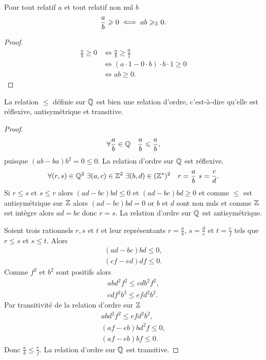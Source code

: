 \begin{prop}
  Pour tout relatif $a$ et tout relatif non nul $b$
  \begin{equation}
    \frac{a}{b} \geqslant 0 \iff ab \geqslant_{\mathbb{Z}} 0.
  \end{equation}
\end{prop}
\begin{proof}
  \begin{align}
    \frac{a}{b} \geqslant 0 &\iff \frac{a}{b} \geqslant \frac{0}{1} \\
    & \iff (a \cdot 1 - 0 \cdot b)\cdot b \cdot 1 \geqslant 0 \\
    & \iff ab \geqslant 0.
  \end{align}
\end{proof}
\begin{prop}
  La relation $\leqslant$ définie sur $\mathbb{Q}$ est bien une relation d'ordre, c'est-à-dire qu'elle est réflexive, antisymétrique et transitive.
\end{prop}
\begin{proof}
  \begin{equation}
    \forall \frac{a}{b} \in \mathbb{Q} \quad \frac{a}{b} \leqslant \frac{a}{b},
  \end{equation}
  puisque $(ab-ba)b^2=0 \leqslant 0$. La relation d'ordre sur $\mathbb{Q}$ est réflexive.
  \begin{equation}
    \forall (r,s) \in \Q^2 \ \exists (a,c) \in \Z^2 \ \exists (b,d) \in (\Z^*)^2 \quad r=\frac{a}{b} \ s=\frac{c}{d}.
  \end{equation}
  Si $r\leqslant s$ et $s \leqslant r$ alors $(ad-bc)bd \leqslant 0$ et $(ad-bc)bd \geqslant 0$ et comme $\leqslant$ est antisymétrique sur $\mathbb{Z}$ alors $(ad-bc)bd=0$ or $b$ et $d$ sont non nuls et comme $\mathbb{Z}$ est intègre alors $ad=bc$ donc $r=s$. La relation d'ordre sur $\mathbb{Q}$ est antisymétrique.

Soient trois rationnels $r,s$ et $t$ et leur représentants $r=\frac{a}{b}$, $s=\frac{d}{c}$ et $t=\frac{e}{f}$ tels que $r \leqslant s$ et $s \leqslant t$. Alors
\begin{align}
  (ad-bc)bd \leqslant 0, \\
  (cf-ed)df \leqslant 0.
\end{align}
Comme $f^2$ et $b^2$ sont positifs alors
\begin{align}
  abd^2f^2 \leqslant cdb^2f^2, \\
  cdf^2b^2 \leqslant efd^2b^2.
\end{align}
Par transitivité de la relation d'ordre sur $\mathbb{Z}$
\begin{align}
  abd^2f^2 \leqslant efd^2b^2, \\
  (af-eb)bd^2f \leqslant 0, \\
  (af-eb)bf \leqslant 0.
\end{align}
Donc $\frac{a}{b} \leqslant \frac{e}{f}$. La relation d'ordre sur $\mathbb{Q}$ est transitive.
\end{proof}
